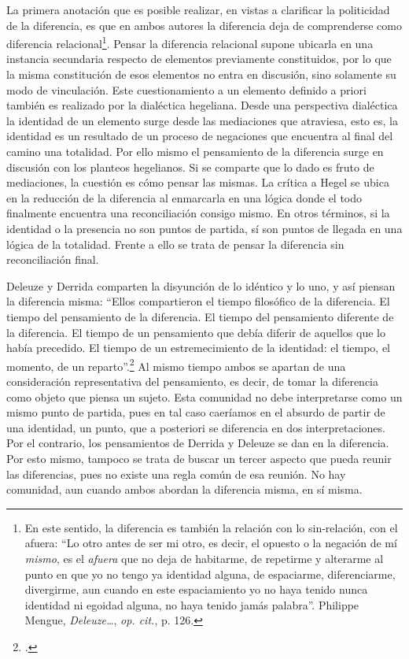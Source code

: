 \documentclass{book}
\begin{document}
La primera anotación que es posible realizar, en vistas a clarificar la
politicidad de la diferencia, es que en ambos autores la diferencia deja
de comprenderse como diferencia relacional\footnote{En este sentido, la
  diferencia es también la relación con lo sin-relación, con el afuera:
  \enquote{Lo otro antes de ser mi otro, es decir, el opuesto o la negación de
  mí \emph{mismo}, es el \emph{afuera} que no deja de habitarme, de
  repetirme y alterarme al punto en que yo no tengo ya identidad alguna,
  de espaciarme, diferenciarme, divergirme, aun cuando en este
  espaciamiento yo no haya tenido nunca identidad ni egoidad alguna, no
  haya tenido jamás palabra}. Philippe Mengue, \emph{Deleuze\ldots{}},
  \emph{op. cit.}, p. 126.}. Pensar la diferencia relacional supone
ubicarla en una instancia secundaria respecto de elementos previamente
constituidos, por lo que la misma constitución de esos elementos no
entra en discusión, sino solamente su modo de vinculación. Este
cuestionamiento a un elemento definido a priori también es realizado por
la dialéctica hegeliana. Desde una perspectiva dialéctica la identidad
de un elemento surge desde las mediaciones que atraviesa, esto es, la
identidad es un resultado de un proceso de negaciones que encuentra al
final del camino una totalidad. Por ello mismo el pensamiento de la
diferencia surge en discusión con los planteos hegelianos. Si se
comparte que lo dado es fruto de mediaciones, la cuestión es cómo pensar
las mismas. La crítica a Hegel se ubica en la reducción de la diferencia
al enmarcarla en una lógica donde el todo finalmente encuentra una
reconciliación consigo mismo. En otros términos, si la identidad o la
presencia no son puntos de partida, sí son puntos de llegada en una
lógica de la totalidad. Frente a ello se trata de pensar la diferencia
sin reconciliación final.

Deleuze y Derrida comparten la disyunción de lo idéntico y lo uno, y así
piensan la diferencia misma: \enquote{Ellos compartieron el tiempo filosófico de
la diferencia. El tiempo del pensamiento de la diferencia. El tiempo del
pensamiento diferente de la diferencia. El tiempo de un pensamiento que
debía diferir de aquellos que lo había precedido. El tiempo de un
estremecimiento de la identidad: el tiempo, el momento, de un
reparto}.\footcite[250]{nancy2008} Al mismo tiempo ambos se apartan
de una consideración representativa del pensamiento, es decir, de tomar
la diferencia como objeto que piensa un sujeto. Esta comunidad no debe
interpretarse como un mismo punto de partida, pues en tal caso caeríamos
en el absurdo de partir de una identidad, un punto, que a posteriori se
diferencia en dos interpretaciones. Por el contrario, los pensamientos
de Derrida y Deleuze se dan en la diferencia. Por esto mismo, tampoco se
trata de buscar un tercer aspecto que pueda reunir las diferencias, pues
no existe una regla común de esa reunión. No hay comunidad, aun cuando
ambos abordan la diferencia misma, en sí misma.
\end{document}

